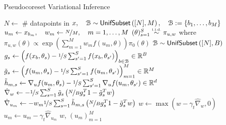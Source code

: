 \begin{algorithm}[!t]
	\caption{Pseudocoreset Variational Inference}
	\label{alg:psvi}
	\begin{algorithmic}[1]
		\State $N \gets $ \# datapoints in $x, \quad \mathcal{B}\sim{\sf{UnifSubset}}\left([N], M\right), \quad \mathcal{B} := \left\{b_1, \dots, b_M\right\}$ 
		\State $u_m \gets x_{b_m}, \quad w_m \gets \nicefrac{N}{M}, \quad m=1, \dots, M$
		\State $(\theta)_{s=1}^{S}  \distiid \pi_{u,w}$ where $\pi_{u,w}(\theta) \propto \exp\left(\sum_{m=1}^Mw_m f(u_m, \theta)\right)\pi_0(\theta)$
		\State $\mathcal{B}\sim{\sf{UnifSubset}}\left([N], B\right)$ 
		 	
		\State $g_{s} \gets \left( f(x_b, \theta_s ) - \nicefrac{1}{S}\sum_{s'=1}^S f(x_b, \theta_{s'}) \right)_{b\in\mathcal{B}} \in \mathbb{R}^B$ 
		\State $\tilde{g}_s\gets \left(f(u_m, \theta_s) - \nicefrac{1}{S}\sum_{s'=1}^S f(u_m, \theta_{s'})\right)_{m=1}^M\in\mathbb{R}^M$
		\State $\tilde{h}_{m,s} \gets \nabla_u f(u_m, \theta_s) - \nicefrac{1}{S}\sum_{s'=1}^S \nabla_u f(u_m, \theta_{s'})\in\mathbb{R}^d$
		\EndFor
		\EndFor
		\State $\hat\nabla_w \gets -\nicefrac{1}{S}\sum_{s=1}^S \tilde{g}_s\left(\nicefrac{N}{B} g_s^T1 - \tilde{g}_s^Tw\right)$
		\State $\hat\nabla_{u_m} \gets -w_m\nicefrac{1}{S}\sum_{s=1}^S \tilde{h}_{m,s}\left(\nicefrac{N}{B} g_s^T1 - \tilde{g}_s^Tw\right)$
		\EndFor
		\State $w \gets \max(w - \gamma_t\hat\nabla_w, 0)$ 
		 
		\State $u_m \gets u_m - \gamma_t\hat\nabla_{u_m}$
		\EndFor
		\EndFor
		\State\Return $w$, $(u_m)_{m=1}^M$
		\EndProcedure		 
	\end{algorithmic}
\end{algorithm}





